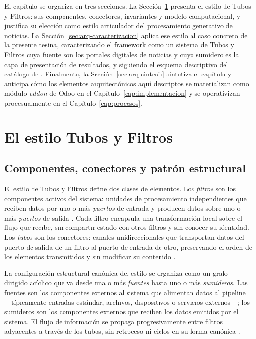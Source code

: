 \documentclass[12pt]{report}
\begin{document}
El capítulo se organiza en tres secciones. La Sección~\ref{sec:arq-estilo} presenta el estilo de Tubos y Filtros: sus componentes, conectores, invariantes y modelo computacional, y justifica su elección como estilo articulador del procesamiento generativo de noticias. La Sección~\ref{sec:arq-caracterizacion} aplica ese estilo al caso concreto de la presente tesina, caracterizando el framework como un sistema de Tubos y Filtros cuya fuente son los portales digitales de noticias y cuyo sumidero es la capa de presentación de resultados, y siguiendo el esquema descriptivo del catálogo de \citet{cristia:2025}. Finalmente, la Sección~\ref{sec:arq-sintesis} sintetiza el capítulo y anticipa cómo los elementos arquitectónicos aquí descriptos se materializan como módulo \textit{addon} de Odoo en el Capítulo~\ref{cap:implementacion} y se operativizan procesualmente en el Capítulo~\ref{cap:procesos}.

\section{El estilo Tubos y Filtros}
\label{sec:arq-estilo}

\subsection{Componentes, conectores y patrón estructural}
\label{sec:arq-estilo-componentes}

El estilo de Tubos y Filtros define dos clases de elementos. Los \textit{filtros} son los componentes activos del sistema: unidades de procesamiento independientes que reciben datos por uno o más \textit{puertos} de entrada y producen datos sobre uno o más \textit{puertos} de salida \citep{cristia:2025}. Cada filtro encapsula una transformación local sobre el flujo que recibe, sin compartir estado con otros filtros y sin conocer su identidad. Los \textit{tubos} son los conectores: canales unidireccionales que transportan datos del puerto de salida de un filtro al puerto de entrada de otro, preservando el orden de los elementos transmitidos y sin modificar su contenido \citep{garlanshaw:1994, shawgarlan:1996}.

La configuración estructural canónica del estilo se organiza como un grafo dirigido acíclico que va desde una o más \textit{fuentes} hasta uno o más \textit{sumideros}. Las fuentes son los componentes externos al sistema que alimentan datos al pipeline ---típicamente entradas estándar, archivos, dispositivos o servicios externos---; los sumideros son los componentes externos que reciben los datos emitidos por el sistema. El flujo de información se propaga progresivamente entre filtros adyacentes a través de los tubos, sin retroceso ni ciclos en su forma canónica \citep{cristia:2025}.
\end{document}
